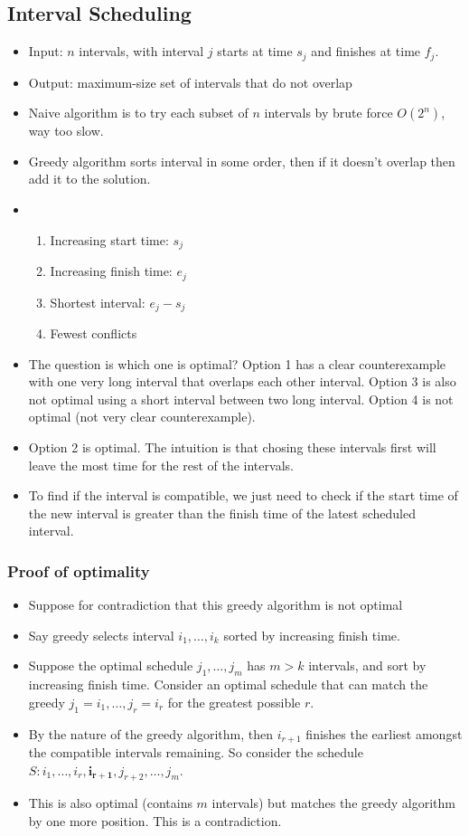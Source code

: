 \documentclass[a4paper,12pt]{article}
\begin{document}
\subsection{Interval Scheduling}
\begin{itemize}
    \item Input: $n$ intervals, with interval $j$ starts at time $s_j$ and finishes at time $f_j$.
    \item Output: maximum-size set of intervals that do not overlap
    \item Naive algorithm is to try each subset of $n$ intervals by brute force $O(2^n)$, way too slow.
    \item Greedy algorithm sorts interval in some order, then if it doesn't overlap then add it to the solution.
    \item {}
    \begin{enumerate}
        \item Increasing start time: $s_j$
        \item Increasing finish time: $e_j$
        \item Shortest interval: $e_j-s_j$
        \item Fewest conflicts
    \end{enumerate}
    \item The question is which one is optimal? Option 1 has a clear counterexample with one very long interval that overlaps each other interval. Option 3 is also not optimal using a short interval between two long interval. Option 4 is not optimal (not very clear counterexample).
    \item Option 2 is optimal. The intuition is that chosing these intervals first will leave the most time for the rest of the intervals.
    \item To find if the interval is compatible, we just need to check if the start time of the new interval is greater than the finish time of the latest scheduled interval.
\end{itemize}
\subsubsection{Proof of optimality}
\begin{itemize}
    \item Suppose for contradiction that this greedy algorithm is not optimal
    \item Say greedy selects interval $i_1,\dots,i_k$ sorted by increasing finish time.
    \item Suppose the optimal schedule $j_1,\dots,j_m$ has $m>k$ intervals, and sort by increasing finish time. Consider an optimal schedule that can match the greedy $j_1=i_1,\dots,j_r=i_r$ for the greatest possible $r$.
    \item By the nature of the greedy algorithm, then $i_{r+1}$ finishes the earliest amongst the compatible intervals remaining. So consider the schedule $S:i_1,\dots,i_r,\mathbf{i_{r+1}},j_{r+2},\dots,j_m$. 
    \item This is also optimal (contains $m$ intervals) but matches the greedy algorithm by one more position. This is a contradiction.
\end{itemize}
\end{document}
